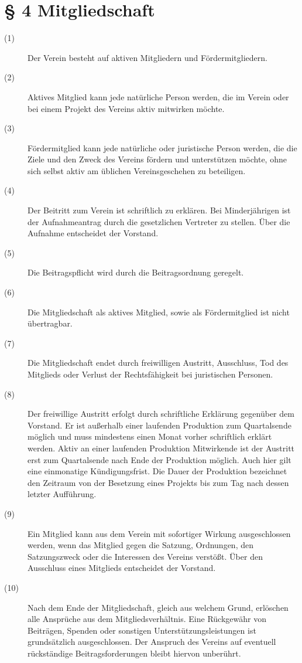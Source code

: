 \documentclass[a4paper,12pt]{scrartcl}
\begin{document}
\section*{\S{} 4 Mitgliedschaft}
\begin{description} 

\item[(1)] Der Verein besteht auf aktiven Mitgliedern und Fördermitgliedern.
\item[(2)] Aktives Mitglied kann jede natürliche Person werden, die im Verein oder bei einem Projekt des Vereins aktiv mitwirken möchte.
\item[(3)] Fördermitglied kann jede natürliche oder juristische Person werden, die die Ziele und den Zweck des Vereins fördern und unterstützen möchte, ohne sich selbst aktiv am üblichen Vereinsgeschehen zu beteiligen.
\item[(4)] Der Beitritt zum Verein ist schriftlich zu erklären. Bei Minderjährigen ist der Aufnahmeantrag durch die gesetzlichen Vertreter zu stellen. Über die Aufnahme entscheidet der Vorstand.
\item[(5)] Die Beitragspflicht wird durch die Beitragsordnung geregelt.
\item[(6)] Die Mitgliedschaft als aktives Mitglied, sowie als Fördermitglied ist nicht übertragbar. 
\item[(7)] Die Mitgliedschaft endet durch freiwilligen Austritt, Ausschluss, Tod des Mitglieds oder Verlust der Rechtsfähigkeit bei juristischen Personen. 
\item[(8)] Der freiwillige Austritt erfolgt durch schriftliche Erklärung gegenüber dem Vorstand. Er ist außerhalb einer laufenden Produktion zum Quartalsende möglich und muss mindestens einen Monat vorher schriftlich erklärt werden. Aktiv an einer laufenden Produktion Mitwirkende ist der Austritt erst zum Quartalsende nach Ende der Produktion möglich. Auch hier gilt eine einmonatige Kündigungsfrist. Die Dauer der Produktion bezeichnet den Zeitraum von der Besetzung eines Projekts bis zum Tag nach dessen letzter Aufführung.
\item[(9)] Ein Mitglied kann aus dem Verein mit sofortiger Wirkung ausgeschlossen werden, wenn das Mitglied gegen die Satzung, Ordnungen, den Satzungszweck oder die Interessen des Vereins verstößt. Über den Ausschluss eines Mitglieds entscheidet der Vorstand.
\item[(10)] Nach dem Ende der Mitgliedschaft, gleich aus welchem Grund, erlöschen alle Ansprüche aus dem Mitgliedsverhältnis. Eine Rückgewähr von Beiträgen, Spenden oder sonstigen Unterstützungsleistungen ist grundsätzlich ausgeschlossen. Der Anspruch des Vereins auf eventuell rückständige Beitragsforderungen bleibt hiervon unberührt.

\end{description}
\end{document}
